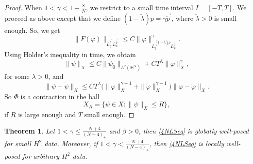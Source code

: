 \documentclass[10pt,leqno]{amsart}
\newtheorem{thm}{Theorem}[section]
\numberwithin{equation}{section}
\newcommand{\field}[1]{\mathbb{#1}}
\newcommand{\Hy}{\field{H}}
\begin{document}
\begin{proof}
When $1<\gamma<1+\tfrac{8}{N}$, we restrict to a small time interval $I=[-T,T]$. We proceed as above except that we define $(1-\tilde{\lambda}) p=\gamma \tilde{p}^\prime$, where $\tilde{\lambda}>0$ is small enough. So, we get
$$\|F(\varphi)\|_{L_t^{\tilde{p}^\prime} L_x^{\tilde{q}^\prime}} \leq C \|\varphi\|^\gamma_{L_t^{(1-\tilde{\lambda}) p} L_x^{q}}. $$ 
Using H\"older's inequality in time, we obtain
$$\|\psi\|_X \leq C \|\psi_0\|_{L^2(\Hy^N)} +CT^\lambda \|\varphi\|_X^\gamma,$$
for some $\lambda >0$, and
$$\|\psi-\tilde{\psi}\|_X \leq C T^\lambda \big(\|\varphi\|_X^{\gamma -1}+ \|\tilde{\varphi}\|_X^{\gamma -1}\big) \|\varphi-\tilde{\varphi}\|_X.$$
So $\Phi$ is a contraction in the ball
$$X_R = \{\psi\in X \colon \|\psi\|_X \leq R  \},$$
if $R$ is large enough and $T$ small enough. 
\end{proof}


\begin{thm}
\label{thmexh2}
Let $1<\gamma \leq \tfrac{N+4}{(N-4)_+}$ and $\beta >0$, then \eqref{4NLSeq} is globally well-posed for small $H^2$ data. Moreover, if $1<\gamma <\tfrac{N+4}{(N-4)_+}$, then \eqref{4NLSeq} is locally well-posed for arbitrary $H^2$ data.
\end{thm}
\end{document}
